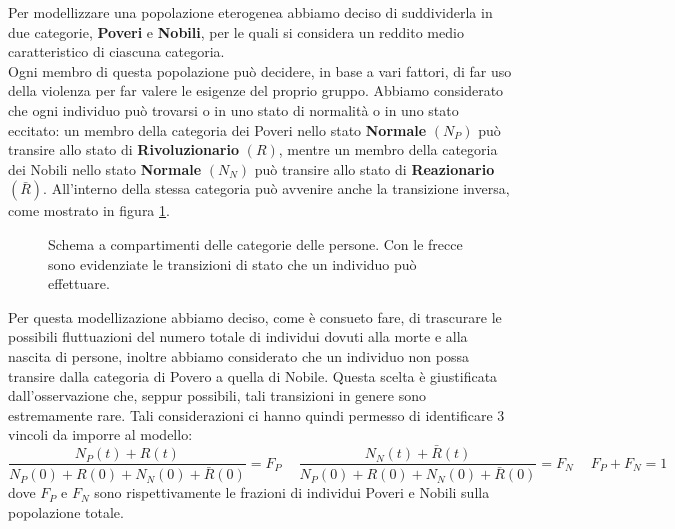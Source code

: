 Per modellizzare una popolazione eterogenea abbiamo deciso di suddividerla in due categorie, \textbf{Poveri} e \textbf{Nobili}, per le quali si considera un reddito medio caratteristico di ciascuna categoria.\\
Ogni membro di questa popolazione può decidere, in base a vari fattori, di far uso della violenza per far valere le esigenze del proprio gruppo. Abbiamo considerato che ogni individuo può trovarsi o in uno stato di normalità o in uno stato eccitato: un membro della categoria dei Poveri nello stato \textbf{Normale} $(N_P)$ può transire allo stato di \textbf{Rivoluzionario} $(R)$, mentre un membro della categoria dei Nobili nello stato \textbf{Normale} $(N_N)$ può transire allo stato di \textbf{Reazionario} $(\bar{R})$. All'interno della stessa categoria può avvenire anche la transizione inversa, come mostrato in figura \ref{fig:CompartmentScheme}.\\
\begin{figure}[H]
	\centering
	
	\caption{Schema a compartimenti delle categorie delle persone. Con le frecce sono evidenziate le transizioni di stato che un individuo può effettuare.}\label{fig:CompartmentScheme}
\end{figure}
Per questa modellizazione abbiamo deciso, come è consueto fare, di trascurare le possibili fluttuazioni del numero totale di individui dovuti alla morte e alla nascita di persone, inoltre abbiamo considerato che un individuo non possa transire dalla categoria di Povero a quella di Nobile. Questa scelta è giustificata dall'osservazione che, seppur possibili, tali transizioni in genere sono estremamente rare. Tali considerazioni ci hanno quindi permesso di identificare 3 vincoli da imporre al modello:
\begin{equation}
    \frac{N_P(t)+R(t)}{N_P(0)+R(0)+N_N(0)+\bar{R}(0)}=F_P \quad\:\frac{N_N(t)+\bar{R}(t)}{N_P(0)+R(0)+N_N(0)+\bar{R}(0)}=F_N \quad\: F_P+F_N=1 
	\label{vincoli}
\end{equation}
dove $F_P$ e $F_N$ sono rispettivamente le frazioni di individui Poveri e Nobili sulla popolazione totale.\\

